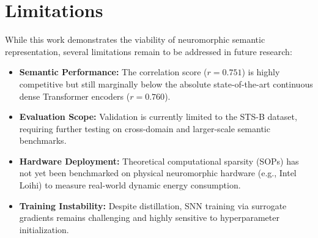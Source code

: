 \documentclass{article} %
\begin{document}
\section{Limitations}
\label{sec:limitations}
While this work demonstrates the viability of neuromorphic semantic representation, several limitations remain to be addressed in future research:
\begin{itemize}
    \item \textbf{Semantic Performance:} The correlation score ($r=0.751$) is highly competitive but still marginally below the absolute state-of-the-art continuous dense Transformer encoders ($r=0.760$).
    \item \textbf{Evaluation Scope:} Validation is currently limited to the STS-B dataset, requiring further testing on cross-domain and larger-scale semantic benchmarks.
    \item \textbf{Hardware Deployment:} Theoretical computational sparsity (SOPs) has not yet been benchmarked on physical neuromorphic hardware (e.g., Intel Loihi) to measure real-world dynamic energy consumption.
    \item \textbf{Training Instability:} Despite distillation, SNN training via surrogate gradients remains challenging and highly sensitive to hyperparameter initialization.
\end{itemize}



\end{document}
